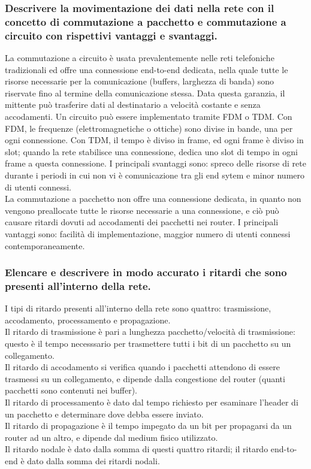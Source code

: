 \documentclass[11pt]{article}
\begin{document}
\subsubsection*{Descrivere la movimentazione dei dati nella rete con il concetto di commutazione a pacchetto e commutazione 
a circuito con rispettivi vantaggi e svantaggi.}
La commutazione a circuito è usata prevalentemente nelle reti telefoniche tradizionali ed offre una connessione end-to-end 
dedicata, nella quale tutte le risorse necessarie per la comunicazione (buffers, larghezza di banda) sono riservate fino 
al termine della comunicazione stessa. Data questa garanzia, il mittente può trasferire dati al destinatario a velocità 
costante e senza accodamenti. Un circuito può essere implementato tramite FDM o TDM. Con FDM, le frequenze (elettromagnetiche 
o ottiche) sono divise in bande, una per ogni connessione. Con TDM, il tempo è diviso in frame, ed ogni frame è diviso in 
slot; quando la rete stabilisce una connessione, dedica uno slot di tempo in ogni frame a questa connessione. I principali 
svantaggi sono: spreco delle risorse di rete durante i periodi in cui non vi è comunicazione tra gli end sytem e minor numero 
di utenti connessi.\\
La commutazione a pacchetto non offre una connessione dedicata, in quanto non vengono preallocate tutte le risorse necessarie 
a una connessione, e ciò può causare ritardi dovuti ad accodamenti dei pacchetti nei router. I principali vantaggi sono: 
facilità di implementazione, maggior numero di utenti connessi contemporaneamente.
\subsubsection*{Elencare e descrivere in modo accurato i ritardi che sono presenti all'interno della rete.}
I tipi di ritardo presenti all'interno della rete sono quattro: trasmissione, accodamento, processamento e propagazione.\\
Il ritardo di trasmissione è pari a lunghezza pacchetto/velocità di trasmissione: questo è il tempo necesssario per trasmettere 
tutti i bit di un pacchetto su un collegamento.\\
Il ritardo di accodamento si verifica quando i pacchetti attendono di essere trasmessi su un collegamento, e dipende dalla 
congestione del router (quanti pacchetti sono contenuti nei buffer).\\
Il ritardo di processamento è dato dal tempo richiesto per esaminare l'header di un pacchetto e determinare dove debba 
essere inviato.\\
Il ritardo di propagazione è il tempo impegato da un bit per propagarsi da un router ad un altro, e dipende dal medium 
fisico utilizzato.\\
Il ritardo nodale è dato dalla somma di questi quattro ritardi; il ritardo end-to-end è dato dalla somma dei ritardi nodali.
\end{document}
